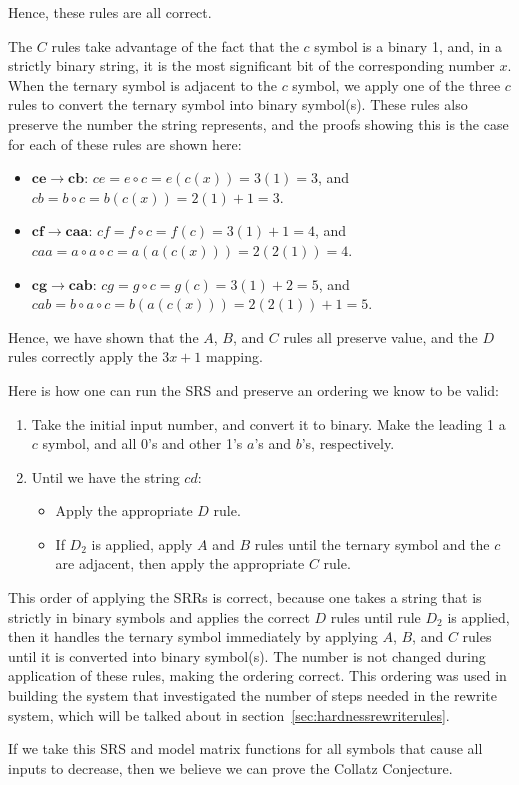 \documentclass[12pt]{article}
\theoremstyle{definition}
\begin{document}
Hence, these rules are all correct. \par
The $C$ rules take advantage of the fact that the $c$ symbol is a binary 1, and, in a strictly binary string, it is the most significant bit of the corresponding number $x$. When the ternary symbol is adjacent to the $c$ symbol, we apply one of the three $c$ rules to convert the ternary symbol into binary symbol(s). These rules also preserve the number the string represents, and the proofs showing this is the case for each of these rules are shown here:
\begin{itemize}
    \item $\boldsymbol{ce \rightarrow cb}$: $ce = e \circ c = e(c(x)) = 3(1) = 3$, and $cb = b
    \circ c = b(c(x)) = 2(1)+1 = 3$.
    \item $\boldsymbol{cf \rightarrow caa}$: $cf = f \circ c = f(c) = 3(1)+ 1 = 4$, and $caa = a \circ a \circ c = a(a(c(x))) = 2(2(1)) = 4$.
    \item $\boldsymbol{cg \rightarrow cab}$: $cg = g \circ c = g(c) = 3(1)+ 2 = 5$, and $cab = b \circ a \circ c = b(a(c(x))) = 2(2(1))+1 = 5$.
\end{itemize}
Hence, we have shown that the $A$, $B$, and $C$ rules all preserve value, and the $D$ rules correctly apply the $3x+1$ mapping. \par
Here is how one can run the SRS and preserve an ordering we know to be valid:
\begin{enumerate}
    \item Take the initial input number, and convert it to binary. Make the leading 1 a $c$ symbol, and all 0's and other 1's $a$'s and $b$'s, respectively.
    \item Until we have the string $cd$: 
    \begin{itemize}
        \item Apply the appropriate $D$ rule.
        \item If $D_2$ is applied, apply $A$ and $B$ rules until the ternary symbol and the $c$ are adjacent, then apply the appropriate $C$ rule.
    \end{itemize}
\end{enumerate}
This order of applying the SRRs is correct, because one takes a string that is strictly in binary symbols and applies the correct $D$ rules until rule $D_2$ is applied, then it handles the ternary symbol immediately by applying $A$, $B$, and $C$ rules until it is converted into binary symbol(s). The number is not changed during application of these rules, making the ordering correct. This ordering was used in building the system that investigated the number of steps needed in the rewrite system, which will be talked about in section~\ref{sec:hardnessrewriterules}. \par
If we take this SRS and model matrix functions for all symbols that cause all inputs to decrease, then we believe we can prove the Collatz Conjecture.
\end{document}
